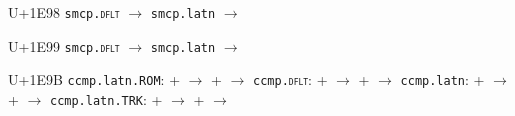 \documentclass{article}
\begin{document}
\begin{substitutions}
\goodbreak

U+1E98  \linebreak
    \texttt{smcp.\textsc{dflt}} $\to$  \linebreak
    \texttt{smcp.latn} $\to$  

\goodbreak

U+1E99  \linebreak
    \texttt{smcp.\textsc{dflt}} $\to$  \linebreak
    \texttt{smcp.latn} $\to$  

\goodbreak

U+1E9B  \linebreak
    \texttt{ccmp.latn.ROM}:
\linebreak\null\quad{} \space +  \space $\to$  
\linebreak\null\quad{} \space +  \space $\to$  
\linebreak
\texttt{ccmp.\textsc{dflt}}:
\linebreak\null\quad{} \space +  \space $\to$  
\linebreak\null\quad{} \space +  \space $\to$  
\linebreak
\texttt{ccmp.latn}:
\linebreak\null\quad{} \space +  \space $\to$  
\linebreak\null\quad{} \space +  \space $\to$  
\linebreak
\texttt{ccmp.latn.TRK}:
\linebreak\null\quad{} \space +  \space $\to$  
\linebreak\null\quad{} \space +  \space $\to$  


\goodbreak


\end{substitutions}
\end{document}
